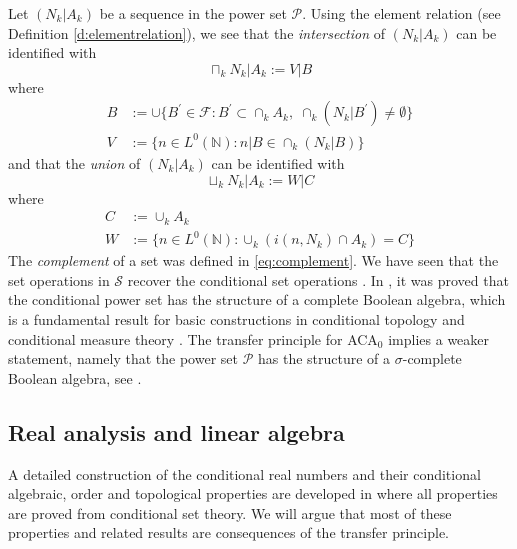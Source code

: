 \documentclass{jloganal}
\numberwithin{equation}{section}
\theoremstyle{plain}
\newcommand\N{\mathbb{N}}
\newcommand\F{\mathcal{F}}
\begin{document}
Let $(N_k|A_k)$ be a sequence in the power set $\mathcal{P}$.  
Using the element relation (see Definition \ref{d:elementrelation}), we see that the \emph{intersection} of $(N_k|A_k)$ can be identified with  
\begin{equation}\label{eq:inter}
\sqcap_k N_k|A_k:=V|B
\end{equation}
where 
\begin{align*}
B&:= \cup\{B^\prime\in \F\colon B^\prime\subset \cap_k A_k, \; \cap_k (N_k|B^\prime)\neq \emptyset\}\\
V&:=\{n\in L^0(\N)\colon n|B\in \cap_k (N_k|B)\}
\end{align*}
and that the  \emph{union} of $(N_k|A_k)$ can be identified with 
\begin{equation}\label{eq:union}
\sqcup_k N_k|A_k:=W|C
\end{equation}
where 
\begin{align*}
C&:= \cup_k A_k \\
W&:=\{n\in L^0(\N)\colon \cup_k (i(n,N_k)\cap A_k)= C\}
\end{align*}
The \emph{complement} of a set was defined in \eqref{eq:complement}.  
We have seen that the set operations in $ \mathcal{S} $ recover the conditional set operations \cite[p.~567]{drapeau2016algebra}.  
In \cite[Corollary 2.10]{drapeau2016algebra}, it was proved that the conditional power set has the structure of a complete Boolean algebra, which is a fundamental result for basic constructions in conditional topology \cite[Section 3]{drapeau2016algebra} and conditional measure theory \cite{jamneshan2017measures}. 
The transfer principle for ACA$_0$ implies a weaker statement, namely that the power set $\mathcal{P}$ has the structure of a $\sigma$-complete Boolean algebra, see \cite{simpson2009subsystems}. 



\subsection{Real analysis and linear algebra}\label{sec:analina} 

A detailed construction of the conditional real numbers and their conditional algebraic, order and topological properties are developed in \cite[Chapter 5]{jamneshan2014theory} where all properties are proved from conditional set theory. 
We will argue that most of these properties and related results are consequences of the transfer principle.  
\end{document}
